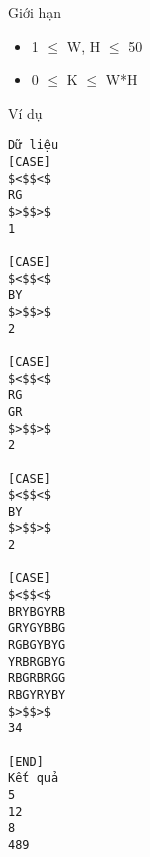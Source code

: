 Giới hạn  
\begin{itemize}
	\item     1  $\le$  W, H  $\le$  50   
	\item     0  $\le$  K  $\le$  W*H   
\end{itemize}
   Ví dụ  
\begin{verbatim}
Dữ liệu
[CASE]
$<$$<$
RG
$>$$>$
1

[CASE]
$<$$<$
BY
$>$$>$
2

[CASE]
$<$$<$
RG
GR
$>$$>$
2

[CASE]
$<$$<$
BY
$>$$>$
2

[CASE]
$<$$<$ 	
BRYBGYRB
GRYGYBBG
RGBGYBYG
YRBRGBYG
RBGRBRGG
RBGYRYBY
$>$$>$
34

[END]
Kết quả
5
12
8
489
\end{verbatim}